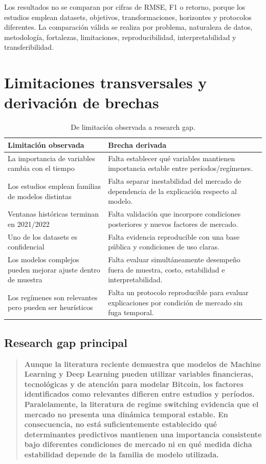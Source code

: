 \documentclass[11pt,letterpaper]{article}
\begin{document}
Los resultados no se comparan por cifras de RMSE, F1 o retorno, porque los estudios emplean datasets, objetivos, transformaciones, horizontes y protocolos diferentes. La comparación válida se realiza por problema, naturaleza de datos, metodología, fortalezas, limitaciones, reproducibilidad, interpretabilidad y transferibilidad.

\section{Limitaciones transversales y derivación de brechas}

\begin{table}[ht]
\centering
\small
\caption{De limitación observada a research gap.}
\begin{tabularx}{\textwidth}{X X}
\toprule
\textbf{Limitación observada} & \textbf{Brecha derivada} \\
\midrule
La importancia de variables cambia con el tiempo & Falta establecer qué variables mantienen importancia estable entre períodos/regímenes. \\
Los estudios emplean familias de modelos distintas & Falta separar inestabilidad del mercado de dependencia de la explicación respecto al modelo. \\
Ventanas históricas terminan en 2021/2022 & Falta validación que incorpore condiciones posteriores y nuevos factores de mercado. \\
Uno de los datasets es confidencial & Falta evidencia reproducible con una base pública y condiciones de uso claras. \\
Los modelos complejos pueden mejorar ajuste dentro de muestra & Falta evaluar simultáneamente desempeño fuera de muestra, costo, estabilidad e interpretabilidad. \\
Los regímenes son relevantes pero pueden ser heurísticos & Falta un protocolo reproducible para evaluar explicaciones por condición de mercado sin fuga temporal. \\
\bottomrule
\end{tabularx}
\end{table}

\subsection{Research gap principal}

\begin{quote}
\textbf{Aunque la literatura reciente demuestra que modelos de Machine Learning y Deep Learning pueden utilizar variables financieras, tecnológicas y de atención para modelar Bitcoin, los factores identificados como relevantes difieren entre estudios y períodos. Paralelamente, la literatura de regime switching evidencia que el mercado no presenta una dinámica temporal estable. En consecuencia, no está suficientemente establecido qué determinantes predictivos mantienen una importancia consistente bajo diferentes condiciones de mercado ni en qué medida dicha estabilidad depende de la familia de modelo utilizada.}
\end{quote}
\end{document}
